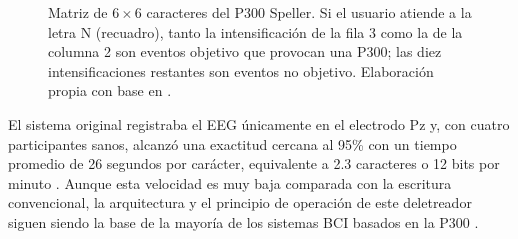 \begin{figure}[htbp]
\centering
{}
\caption{Matriz de $6\times6$ caracteres del P300 Speller. Si el usuario atiende a la letra N
(recuadro), tanto la intensificación de la fila 3 como la de la columna 2 son eventos objetivo que
provocan una P300; las diez intensificaciones restantes son eventos no objetivo. Elaboración propia
con base en \cite{farwell1988}.}
\label{fig:matriz}
\end{figure}

El sistema original registraba el EEG únicamente en el electrodo Pz y, con cuatro participantes
sanos, alcanzó una exactitud cercana al 95\% con un tiempo promedio de 26 segundos por carácter,
equivalente a 2.3 caracteres o 12 bits por minuto \cite{farwell1988}. Aunque esta velocidad es muy
baja comparada con la escritura convencional, la arquitectura y el principio de operación de este
deletreador siguen siendo la base de la mayoría de los sistemas BCI basados en la P300
\cite{contreras2021}.

